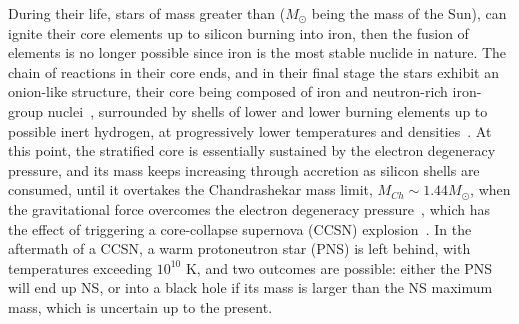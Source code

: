 During their life, stars of mass greater than  
($M_\odot$ being the mass of the Sun), can ignite their core elements up to 
silicon burning into iron, then the fusion of elements is 
no longer possible since iron is the most stable nuclide in nature. 
The chain of reactions in their core ends, and in their final stage the stars 
exhibit an onion-like structure, their core being composed of iron and 
neutron-rich iron-group nuclei~\cite{Bethe1979}, surrounded by shells of lower 
and lower burning elements up to possible inert hydrogen, at progressively 
lower temperatures and densities~\cite{Woosley2002}. 
At this point, the stratified core is essentially sustained by the electron
degeneracy pressure, and its mass keeps increasing through accretion as silicon 
shells are consumed, until it overtakes the Chandrashekar mass limit, $M_{Ch}
\sim 1.44M_\odot$, when the gravitational force overcomes the electron 
degeneracy pressure~\cite{Chandrasekhar1931}, which has the effect of 
triggering a core-collapse supernova (CCSN) explosion~\cite{Janka2007}.
In the aftermath of a CCSN, a warm protoneutron star (PNS) is left behind, with
temperatures exceeding $10^{10}$ K, and two outcomes are possible: either the 
PNS will end up  NS, or into a black hole if its mass is 
larger than the NS maximum mass, which is uncertain up to the present. 
 
